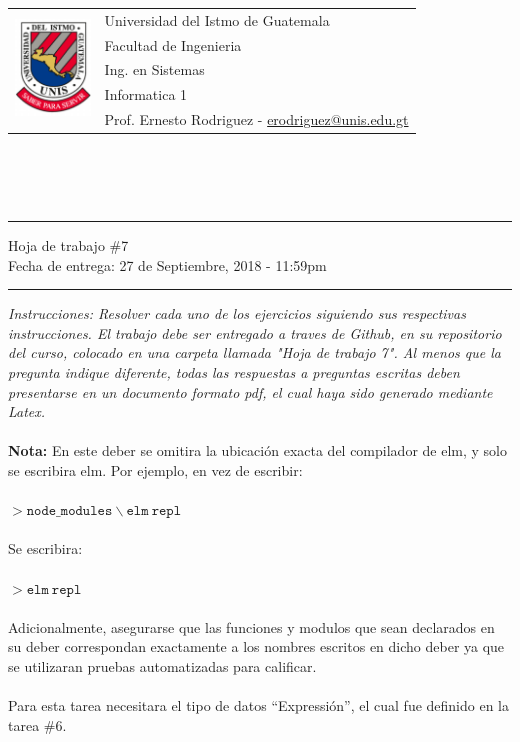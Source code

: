 \documentclass{article}
\newcommand{\horrule}[1]{\rule{\linewidth}{#1}}
\begin{document}
\begin{tabular}{l l}
\multirow{5}{*}{\includegraphics[width=2cm]{../../recursos/logo.png}}
 & Universidad del Istmo de Guatemala \\
 & Facultad de Ingenieria \\
 & Ing. en Sistemas \\
 & Informatica 1 \\
 & Prof. Ernesto Rodriguez - \href{mailto:erodriguez@unis.edu.gt}{erodriguez@unis.edu.gt} \\
\end{tabular}
\\\\\\

\begin{center}
        \horrule{0.5pt}
        \huge{Hoja de trabajo \#7} \\
        \large{Fecha de entrega: 27 de Septiembre, 2018 - 11:59pm} \\
        \horrule{1pt}
\end{center}

\emph{Instrucciones: Resolver cada uno de los ejercicios siguiendo sus respectivas
instrucciones. El trabajo debe ser entregado a traves de Github, en su repositorio del curso, colocado en una
carpeta llamada "Hoja de trabajo 7". Al menos que la pregunta indique diferente, todas las
respuestas a preguntas escritas deben presentarse en un documento formato pdf, el cual
haya sido generado mediante Latex. }\\\\

{\bf Nota: }En este deber se omitira la ubicaci\'on exacta del compilador
de elm, y solo se escribira elm. Por ejemplo, en vez de escribir:\\\\
$>\mathtt{node\_modules}\backslash\mathtt{elm\ repl}$\\\\
Se escribira:\\\\
$>\mathtt{elm\ repl}$\\\\
Adicionalmente, asegurarse que las funciones y modulos que sean declarados
en su deber correspondan exactamente a los nombres escritos en dicho deber
ya que se utilizaran pruebas automatizadas para calificar.
\\\\
Para esta tarea necesitara el tipo de datos ``Expressi\'on'', el cual fue
definido en la tarea \#6.
\end{document}
